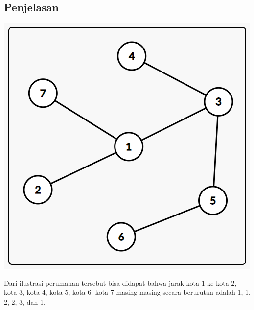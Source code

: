 \documentclass{article}
\begin{document}
\subsection*{Penjelasan}
\begin{center}
\includegraphics[scale=0.6]{graf}
\end{center}
Dari ilustrasi perumahan tersebut bisa didapat bahwa jarak kota-$1$ ke kota-$2$, kota-$3$, kota-$4$, kota-$5$, kota-$6$, kota-$7$ masing-masing secara berurutan adalah 1, 1, 2, 2, 3, dan 1.

\pagebreak
\end{document}
